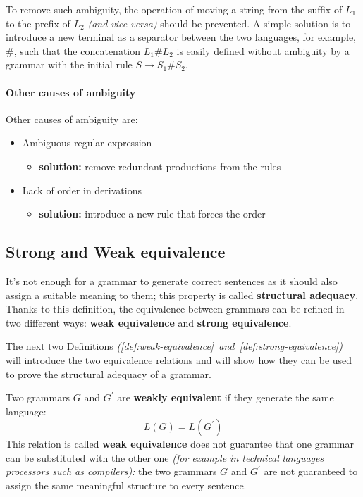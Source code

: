 \documentclass[english]{article}
\begin{document}
To remove such ambiguity, the operation of moving a string from the suffix of \(L_1\) to the prefix of \(L_2\) \textit{(and vice versa)} should be prevented.
A simple solution is to introduce a new terminal as a separator between the two languages, for example, \(\#\), such that the concatenation \(L_1 \# L_2\) is easily defined without ambiguity by a grammar with the initial rule \(S \rightarrow S_1 \# S_2\).

\paragraph{Other causes of ambiguity}
\label{par:other-causes-of-ambiguity}

Other causes of ambiguity are:

\begin{itemize}
  \item Ambiguous regular expression
        \begin{itemize}[label=\(\rightarrow\)]
          \item \textbf{solution:} remove redundant productions from the rules
        \end{itemize}
  \item Lack of order in derivations
        \begin{itemize}[label=\(\rightarrow\)]
          \item \textbf{solution:} introduce a new rule that forces the order
        \end{itemize}
\end{itemize}

\subsection{Strong and Weak equivalence}

It's not enough for a grammar to generate correct sentences as it should also assign a suitable meaning to them;
this property is called \textbf{structural adequacy}.
Thanks to this definition, the equivalence between grammars can be refined in two different ways:
\textbf{weak equivalence} and \textbf{strong equivalence}.

The next two Definitions \textit{(\ref{def:weak-equivalence}~and~\ref{def:strong-equivalence})} will introduce the two equivalence relations and will show how they can be used to prove the structural adequacy of a grammar.

\begin{definition}
  \label{def:weak-equivalence}
  Two grammars \(G\) and \(G^\prime\) are \textbf{weakly equivalent} if they generate the same language:
  \[ L(G) = L(G^\prime) \]
  This relation is called \textbf{weak equivalence} does not guarantee that one grammar can be substituted with the other one \textit{(for example in technical languages processors such as compilers):}
  the two grammars \(G\) and \(G^\prime\) are not guaranteed to assign the same meaningful structure to every sentence.
\end{definition}
\end{document}
